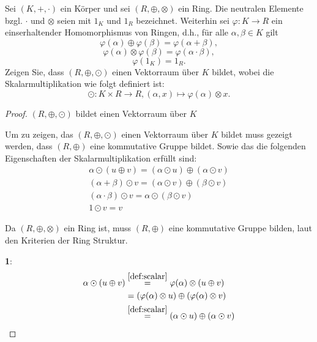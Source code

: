 \documentclass{../problemset}
\author{Michael van Straten}
\begin{document}
\maketitle

\begin{problem}
Sei $(K, +, \cdot)$ ein Körper und sei $(R, \oplus, \otimes)$ ein Ring.
Die neutralen Elemente bzgl. $\cdot$ und $\otimes$ seien mit $1_K$ und $1_R$ bezeichnet.
Weiterhin sei $\varphi: K \to R$ ein einserhaltender Homomorphismus von Ringen, d.h., für alle $\alpha, \beta \in K$ gilt
\[
	\varphi(\alpha) \oplus \varphi(\beta) = \varphi(\alpha + \beta),
\]
\[
	\varphi(\alpha) \otimes \varphi(\beta) = \varphi(\alpha \cdot \beta),
\]
\[
	\varphi(1_K) = 1_R. \label{def:presevesone}
\]
Zeigen Sie, dass $(R, \oplus, \odot)$ einen Vektorraum über $K$ bildet, wobei die Skalarmultiplikation wie folgt definiert ist:
\[
	\odot: K \times R \to R, (\alpha, x) \mapsto \varphi(\alpha) \otimes x. \label{def:scalar}
\]
\begin{proof}
	$(R, \oplus, \odot)$ bildet einen Vektorraum über $K$

	Um zu zeigen, das $(R, \oplus, \odot)$ einen Vektorraum über $K$ bildet muss gezeigt werden, dass
	$(R, \oplus)$ eine kommutative Gruppe bildet. Sowie das die folgenden Eigenschaften der Skalarmultiplikation erfüllt sind: \begin{align}
		\alpha \odot (u \oplus v) = (\alpha \odot u) \oplus (\alpha \odot v) \\
		(\alpha + \beta) \odot v = (\alpha \odot v) \oplus (\beta \odot v)   \\
		(\alpha \cdot \beta) \odot v = \alpha \odot (\beta \odot v)          \\
		1 \odot v = v
	\end{align}

	Da $(R, \oplus, \otimes)$ ein Ring ist, muss $(R, \oplus)$ eine kommutative Gruppe bilden, laut den Kriterien der Ring Struktur. \checkmark

	\textbf{1}: \begin{align*}
		\alpha \odot (u \oplus v) & \stackrel{\ref{def:scalar}}{=} \varphi(\alpha) \otimes (u \oplus v)     \\
		                          & = (\varphi(\alpha) \otimes u) \oplus (\varphi(\alpha) \otimes v)        \\
		                          & \stackrel{\ref{def:scalar}}{=} (\alpha \odot u) \oplus (\alpha \odot v)
	\end{align*}


\end{proof}
\end{problem}
\end{document}
